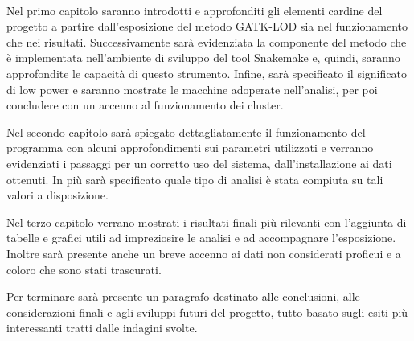 \documentclass[12pt, a4paper]{report}
\begin{document}
\\
Nel primo capitolo saranno introdotti e approfonditi gli elementi cardine del progetto a partire dall'esposizione del metodo GATK-LOD sia nel funzionamento che nei risultati. Successivamente sarà evidenziata la componente del metodo che è implementata nell'ambiente di sviluppo del tool Snakemake e, quindi, saranno approfondite le capacità di questo strumento. Infine, sarà specificato il significato di low power e saranno mostrate le macchine adoperate nell'analisi, per poi concludere con un accenno al funzionamento dei cluster. 

Nel secondo capitolo sarà spiegato dettagliatamente il funzionamento del programma con alcuni approfondimenti sui parametri utilizzati e verranno evidenziati i passaggi per un corretto uso del sistema, dall'installazione ai dati ottenuti. In più sarà specificato quale tipo di analisi è stata compiuta su tali valori a disposizione.

Nel terzo capitolo verrano mostrati i risultati finali più rilevanti con l'aggiunta di tabelle e grafici utili ad impreziosire le analisi e ad accompagnare l'esposizione. Inoltre sarà presente anche un breve accenno ai dati non considerati proficui e a coloro che sono stati trascurati. 

Per terminare sarà presente un paragrafo destinato alle conclusioni, alle considerazioni finali e agli sviluppi futuri del progetto, tutto basato sugli esiti più interessanti tratti dalle indagini svolte.



\end{document}
